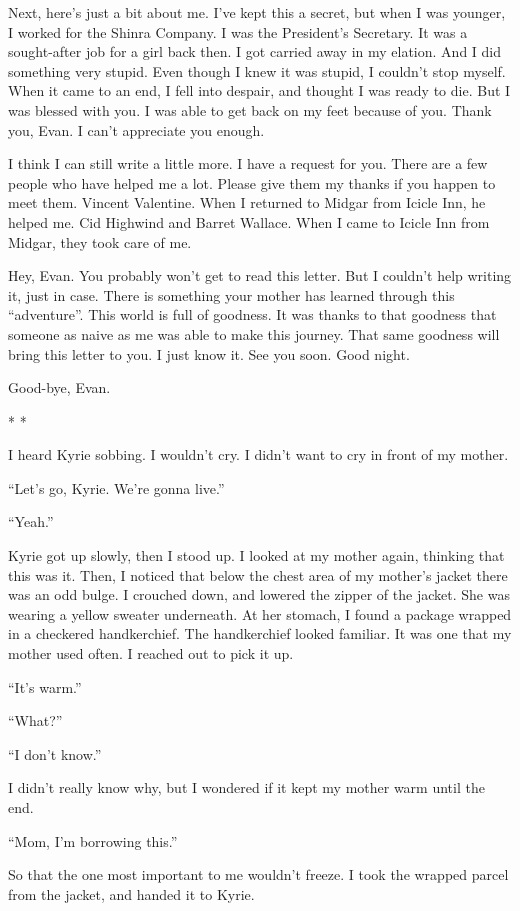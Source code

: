 \documentclass[oneside]{book}
\begin{document}
Next, here’s just a bit about me. I’ve kept this a secret, but when I was younger, I worked for the Shinra Company. I was the President’s Secretary. It was a sought-after job for a girl back then. I got carried away in my elation. And I did something very stupid. Even though I knew it was stupid, I couldn’t stop myself. When it came to an end, I fell into despair, and thought I was ready to die. But I was blessed with you. I was able to get back on my feet because of you. Thank you, Evan. I can’t appreciate you enough.

I think I can still write a little more. I have a request for you. There are a few people who have helped me a lot. Please give them my thanks if you happen to meet them. Vincent Valentine. When I returned to Midgar from Icicle Inn, he helped me. Cid Highwind and Barret Wallace. When I came to Icicle Inn from Midgar, they took care of me.

Hey, Evan. You probably won’t get to read this letter. But I couldn’t help writing it, just in case. There is something your mother has learned through this “adventure”. This world is full of goodness. It was thanks to that goodness that someone as naive as me was able to make this journey. That same goodness will bring this letter to you. I just know it. See you soon. Good night.

Good-bye, Evan.

* *

I heard Kyrie sobbing. I wouldn’t cry. I didn’t want to cry in front of my mother.

“Let’s go, Kyrie. We’re gonna live.”

“Yeah.”

Kyrie got up slowly, then I stood up. I looked at my mother again, thinking that this was it. Then, I noticed that below the chest area of my mother’s jacket there was an odd bulge. I crouched down, and lowered the zipper of the jacket. She was wearing a yellow sweater underneath. At her stomach, I found a package wrapped in a checkered handkerchief. The handkerchief looked familiar. It was one that my mother used often. I reached out to pick it up.

“It’s warm.”

“What?”

“I don’t know.”

I didn’t really know why, but I wondered if it kept my mother warm until the end.

“Mom, I’m borrowing this.”

So that the one most important to me wouldn’t freeze. I took the wrapped parcel from the jacket, and handed it to Kyrie.
\end{document}
